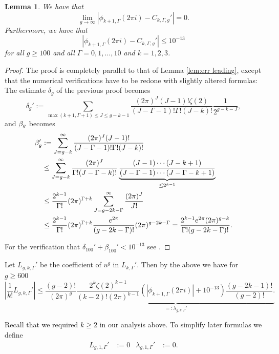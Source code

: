 \documentclass[12pt]{amsart}
\newtheorem{lem}[thm]{Lemma}
\theoremstyle{definition}
\numberwithin{equation}{section}
\newcommand{\numcheck}[1]{\cite[Computation #1]{SupplementaryNotebook}}
\theoremstyle{definition} %
\theoremstyle{remark}
\begin{document}
\begin{lem}\label{lem:err subleading}
    We have that 
    \[
        \lim_{g\to\infty}|\phi_{k+1,\Gamma}(2\pi i)-C_{k,\Gamma,g}'| = 0.
    \]
    Furthermore, we have that 
    \[
        |\phi_{k+1,\Gamma}(2\pi i)-C_{k,\Gamma,g}'| \leq 10^{-13}
    \]
    for all $g\geq 100$ and all $\Gamma=0,1,\dots ,10$ and $k=1,2,3$.
\end{lem}
\begin{proof}
The proof is completely parallel to that of Lemma \ref{lem:err leading}, except that the numerical verifications have to be redone with slightly altered formulas: The estimate $\delta_g$ of the previous proof becomes 
\[
\delta_g' := \sum_{\max(k+1,\Gamma+1)\leq J\leq g-k-1} 
    \frac{(2\pi)^J (J-1)!\zeta(2)}{ (J-\Gamma-1)! \Gamma!(J-k)!}
\frac{1}{2^{g-k-J}},
\]
and $\beta_g$ becomes
\begin{align*}
    \beta_{g}'&:=
    \sum_{J= g-k}^\infty 
    \frac{(2\pi)^J (J-1)!}{ (J-\Gamma-1)! \Gamma!(J-k)!}
    \\&\leq 
    \sum_{J= g-k}^\infty 
    \frac{(2\pi)^J }{ \Gamma!(J-\Gamma-k)!} 
    \underbrace{\frac{(J-1)\cdots(J-k+1)}{(J-\Gamma-1)\cdots(J-\Gamma-k+1)}}_{\leq 2^{k-1}}
    \\&\leq
    \frac{2^{k-1}}{\Gamma!}
    (2\pi)^{\Gamma+k}
    \sum_{J= g-2k-\Gamma}^\infty 
    \frac{(2\pi)^J }{ J!} 
    \\&\leq \frac{2^{k-1}}{\Gamma!}
    (2\pi)^{\Gamma+k}
    \frac{e^{2\pi}}{(g-2k-\Gamma)!} (2\pi)^{g-2k-\Gamma}  
    =\frac{2^{k-1}e^{2\pi}(2\pi)^{g-k}}{\Gamma!(g-2k-\Gamma)!}.
  \end{align*}

For the verification that $\delta_{100}'+\beta_{100}'<10^{-13}$ see \numcheck{CKASYMP2}.
\end{proof}

Let $L_{g,k,\Gamma}'$ be the coefficient of $u^g$ in $L_{k,\Gamma}'$.
Then by the above we have for $g\geq 600$
\begin{equation}\label{equ:lap def}
    \left|\frac{1}{k!} L_{g,k,\Gamma}'\right|
    \leq 
    \frac{(g-2)!}{(2\pi)^g}
    \underbrace{
        \frac{2^k\zeta(2)^{k-1}}{(k-2)!(2\pi)^{k-1}}
    (|\phi_{k+1,\Gamma}(2\pi i)| + 10^{-13})
    \frac{(g-2k-1)!}{(g-2)!}
    .}_{=:\lambda_{g,k,\Gamma}'}
\end{equation}

Recall that we required $k\geq 2$ in our analysis above. To simplify later formulas we define %
\begin{align*}
   L_{g,1,\Gamma}' &:= 0 
   &
   \lambda_{g,1,\Gamma}'&:=0.
\end{align*}
\end{document}
